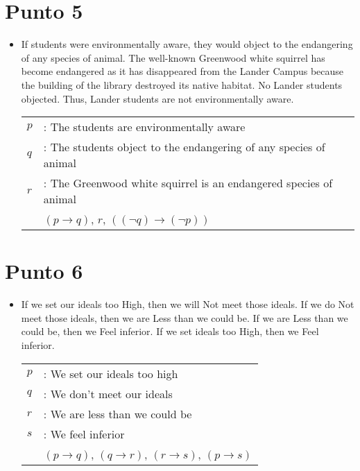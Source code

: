 \documentclass{article}
\begin{document}
\section{Punto 5}
\begin{itemize}
	\item If students were environmentally aware, they would object to the endangering of any species of animal. The well-known Greenwood white squirrel has become endangered as it has disappeared from the Lander Campus because the building of the library destroyed its native habitat. No Lander students objected. Thus, Lander students are not environmentally aware.
	      \begin{center}
		      \begin{NiceTabular}{l l}
			      $p$ & : The students are environmentally aware                          \\
			      $q$ & : The students object to the endangering of any species of animal \\
			      $r$ & : The Greenwood white squirrel is an endangered species of animal \\
			      \hline
			          & $(p \to q)$, $r$, $((\lnot q) \to (\lnot p))$
		      \end{NiceTabular}
	      \end{center}
\end{itemize}
\section{Punto 6}
\begin{itemize}
	\item If we set our ideals too High, then we will Not meet those ideals. If we do Not meet those ideals, then we are Less than we could be. If we are Less than we could be, then we Feel inferior. If we set ideals too High, then we Feel inferior.
	      \begin{center}
		      \begin{NiceTabular}{l l}
			      $p$ & : We set our ideals too high                       \\
			      $q$ & : We don't meet our ideals                         \\
			      $r$ & : We are less than we could be                     \\
			      $s$ & : We feel inferior                                 \\
			      \hline
			          & $(p \to q)$, $(q \to r)$, $(r \to s)$, $(p \to s)$
		      \end{NiceTabular}
	      \end{center}
\end{itemize}
\clearpage
\end{document}
